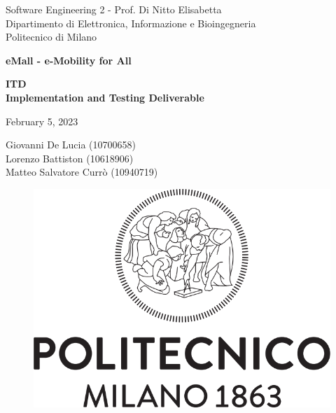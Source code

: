 \documentclass{article}
\begin{document}
\begin{titlepage}
  \centering
  {\normalsize
    Software Engineering 2 - Prof. Di Nitto Elisabetta \\
    Dipartimento di Elettronica, Informazione e Bioingegneria \\
    Politecnico di Milano \par
  }     \vspace{3cm}
  {\Huge \textbf{eMall - e-Mobility for All\\} } \vspace{1cm}
  {\large \textbf{ITD\\Implementation and Testing Deliverable} \par} \vspace{1cm}
  {\normalsize February 5, 2023 \par} \vspace{4cm}
  {\normalsize Giovanni De Lucia (10700658) \\ Lorenzo Battiston (10618906) \\  Matteo Salvatore Currò (10940719)\par} \vspace{4cm}
  \begin{figure}[h]
    \centering
    \includegraphics[scale=0.3]{src/Logo_Politecnico_Milano.png}
  \end{figure} \vspace{0.5cm}
\end{titlepage}

\tableofcontents









\end{document}
